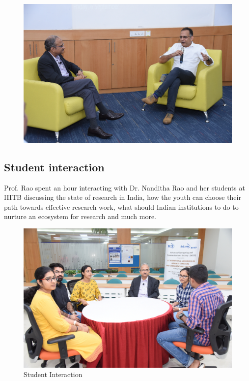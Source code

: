 \begin{multicols}{2}
\begin{figure}[H]
\centering
\includegraphics[scale=.9]{src/Figures/events/event-fig04.jpg}
\end{figure}

\noindent
\subsection*{Student interaction}

Prof. Rao spent an hour interacting with Dr. Nanditha Rao and her students at IIITB discussing the state of research in India, how the youth can choose their path towards effective research work, what should Indian institutions to do to nurture an ecosystem for research and much more. 

\begin{figure}[H]
\centering
\includegraphics[scale=.9]{src/Figures/events/event-fig05.jpg}
\caption{Student Interaction}\label{event-fig05}
\end{figure}



\end{multicols}
